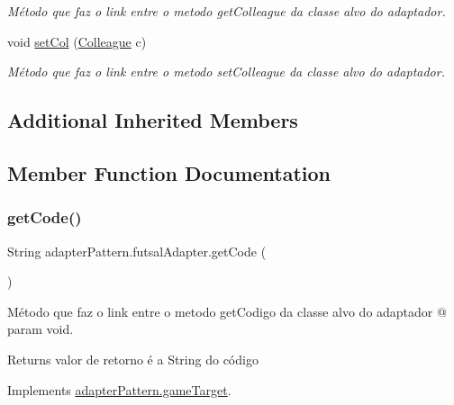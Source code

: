\begin{DoxyCompactItemize}
\begin{DoxyCompactList}\small\item\em Método que faz o link entre o metodo get\+Colleague da classe alvo do adaptador. \end{DoxyCompactList}\item 
void \mbox{\hyperlink{classadapter_pattern_1_1futsal_adapter_a5832c5c7032e7254a7d3476e72f9834f}{set\+Col}} (\mbox{\hyperlink{classmediator_pattern_1_1_colleague}{Colleague}} c)
\begin{DoxyCompactList}\small\item\em Método que faz o link entre o metodo set\+Colleague da classe alvo do adaptador. \end{DoxyCompactList}\end{DoxyCompactItemize}
\subsection*{Additional Inherited Members}


\subsection{Member Function Documentation}
\mbox{\label{classadapter_pattern_1_1futsal_adapter_a7d21aebfd57eb0eaf4aa51e9c8c24fb1}} 
\subsubsection{\texorpdfstring{getCode()}{getCode()}}
{\footnotesize\ttfamily String adapter\+Pattern.\+futsal\+Adapter.\+get\+Code (\begin{DoxyParamCaption}{ }\end{DoxyParamCaption})}



Método que faz o link entre o metodo get\+Codigo da classe alvo do adaptador @ param void. 

\begin{DoxyReturn}{Returns}
valor de retorno é a String do código 
\end{DoxyReturn}


Implements \mbox{\hyperlink{interfaceadapter_pattern_1_1game_target_a32fce3f3dd420116a031b051f2464304}{adapter\+Pattern.\+game\+Target}}.

